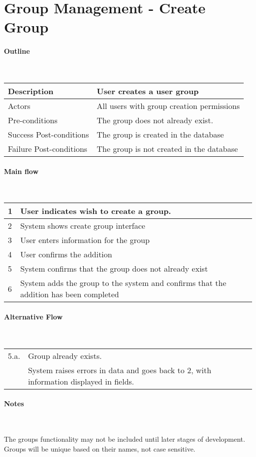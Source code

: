 \section*{Group Management - Create Group} %

\paragraph*{Outline} \

\begin{tabular}{ | l | l | }
\hline
Description & User creates a user group \\ \hline
Actors & All users with group creation permissions \\ \hline
Pre-conditions & The group does not already exist. \\ \hline
Success Post-conditions & The group is created in the database \\ \hline
Failure Post-conditions & The group is not created in the database \\ \hline
\end{tabular}


\paragraph*{Main flow} \

\begin{tabular}{ | l | l | } \hline
1 & User indicates wish to create a group. \\ \hline
2 & System shows create group interface \\ \hline
3 & User enters information for the group \\ \hline
4 & User confirms the addition\\ \hline
5 & System confirms that the group does not already exist \\ \hline
6 & System adds the group to the system and confirms that the addition has been completed\\ \hline
\end{tabular}


\paragraph*{Alternative Flow} \

\begin{tabular}{ | l | l | } \hline
5.a. & Group already exists. \\
     & System raises errors in data and goes back to 2, with information displayed in fields.\\ \hline
\end{tabular}

\paragraph*{Notes} \

The groups functionality may not be included until later stages of development. \\
Groups will be unique based on their names, not case sensitive.
